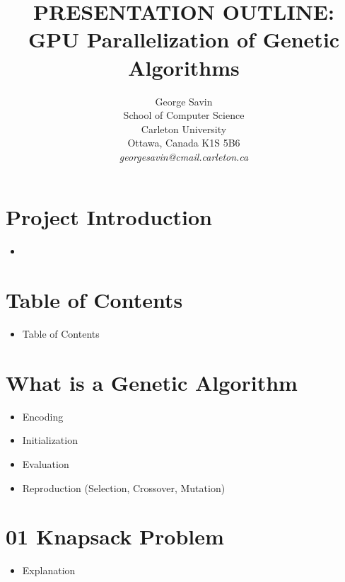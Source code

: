 \documentclass[11pt]{article}       %
\newenvironment{slide}[1]        {\section{#1} \begin{itemize}}%
                                 {\end{itemize}}
\begin{document}


\title{PRESENTATION OUTLINE: GPU Parallelization of Genetic Algorithms}


\author{
George Savin \\
School of Computer Science\\
Carleton University\\
Ottawa, Canada K1S 5B6\\
{\em georgesavin@cmail.carleton.ca}
} %

\maketitle

\begin{slide}{Project Introduction}
\item 
\end{slide}


\begin{slide}{Table of Contents}
\item Table of Contents
\end{slide}

\begin{slide}{What is a Genetic Algorithm}
\item Encoding
\item Initialization
\item Evaluation
\item Reproduction (Selection, Crossover, Mutation)
\end{slide}

\begin{slide}{01 Knapsack Problem}
\item Explanation
\end{slide}
\end{document}
